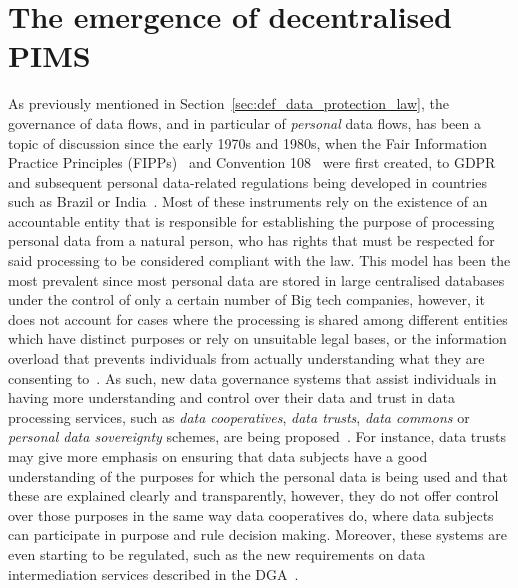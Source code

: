 \section{The emergence of decentralised PIMS}
\label{sec:motivation_legal}

As previously mentioned in Section~\ref{sec:def_data_protection_law}, the governance of data flows, and in particular of \textit{personal} data flows, has been a topic of discussion since the early 1970s and 1980s, when the Fair Information Practice Principles (FIPPs)~\citep{cate_failure_2006} and Convention 108~\citep{council_of_europe_convention_1981} were first created, to GDPR and subsequent personal data-related regulations being developed in countries such as Brazil or India~\citep{bradford_brussels_2019}.
Most of these instruments rely on the existence of an accountable entity that is responsible for establishing the purpose of processing personal data from a natural person, who has rights that must be respected for said processing to be considered compliant with the law.
This model has been the most prevalent since most personal data are stored in large centralised databases under the control of only a certain number of Big tech companies, however, it does not account for cases where the processing is shared among different entities which have distinct purposes or rely on unsuitable legal bases, or the information overload that prevents individuals from actually understanding what they are consenting to~\citep{benshahar_more_2014}.
As such, new data governance systems that assist individuals in having more understanding and control over their data and trust in data processing services, such as \textit{data cooperatives}, \textit{data trusts}, \textit{data commons} or \textit{personal data sovereignty} schemes, are being proposed~\citep{viljoen_relational_2021,craglia_digitranscope_2021}.
For instance, data trusts may give more emphasis on ensuring that data subjects have a good understanding of the purposes for which the personal data is being used and that these are explained clearly and transparently, however, they do not offer control over those purposes in the same way data cooperatives do, where data subjects can participate in purpose and rule decision making.
Moreover, these systems are even starting to be regulated, such as the new requirements on data intermediation services described in the DGA~\citeyearpar{noauthor_regulation_2022}.

